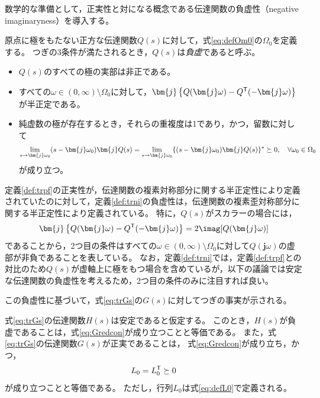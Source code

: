 \documentclass[tombow,dvipdfmx]{corona-a5}
\begin{document}
数学的な準備として，正実性と対になる概念である伝達関数の負虚性（negative imaginaryness）を導入する\cite{petersen2010feedback,xiong2010negative}。

\begin{定義}[伝達関数の負虚性]
\label{def:trni}
原点に極をもたない正方な伝達関数$Q(s)$に対して，式\ref{eq:defOm0}の$\Omega_0$を定義する。
つぎの3条件が満たされるとき，$Q(s)$は\emph{負虚}であると呼ぶ。
\begin{itemize}
\item $Q(s)$のすべての極の実部は非正である。
\item すべての$\omega \in (0,\infty)\setminus \Omega_0$に対して，$\bm{j}\left\{Q(\bm{j} \omega) - Q^{\sf T}(-\bm{j} \omega) \right\}$が半正定である。
\item 純虚数の極が存在するとき，それらの重複度は1であり，かつ，留数に対して
\begin{align*}
\lim_{s \rightarrow \bm{j} \omega_0} (s-\bm{j} \omega_0) \bm{j} Q(s) = 
\lim_{s\rightarrow \bm{j} \omega_0} \{ (s-\bm{j} \omega_0) \bm{j} Q(s)\}^{\sf *}\succeq 0
,\quad
\forall \omega_0 \in \Omega_0
\end{align*}
が成り立つ。
\end{itemize}
\end{定義}

定義\ref{def:trpf}の正実性が，伝達関数の複素対称部分に関する半正定性により定義されていたのに対して，定義\ref{def:trni}の負虚性は，伝達関数の複素歪対称部分に関する半正定性により定義されている。
特に，$Q(s)$がスカラーの場合には，
\begin{align*}
\bm{j}\left\{Q(\bm{j} \omega) - Q^{\sf T}(-\bm{j} \omega) \right\}
= 2 \imag[Q(\bm{j} \omega)]
\end{align*}
であることから，2つ目の条件はすべての$\omega \in (0,\infty)\setminus \Omega_0$に対して$Q(\bm{j}\omega)$の虚部が非負であることを表している。
なお，定義\ref{def:trni}では，定義\ref{def:trpf}との対比のため$Q(s)$が虚軸上に極をもつ場合を含めているが，以下の議論では安定な伝達関数の負虚性を考えるため，2つ目の条件のみに注目すれば良い。

この負虚性に基づいて，式\ref{eq:trGs}の$G(s)$に対してつぎの事実が示される。

\begin{定理}[電気的サブシステムの伝達関数の正実性]
\label{thm:EdynNI}
式\ref{eq:trGs}の伝達関数$H(s)$は安定であると仮定する。
このとき，$H(s)$が負虚であることは，式\ref{eq:Gredcon}が成り立つことと等価である。
また，式\ref{eq:trGs}の伝達関数$G(s)$が正実であることは，
式\ref{eq:Gredcon}が成り立ち，かつ，
\begin{align}\label{eq:pdsp}
L_0 =L_0^{\sf T} \succeq 0
\end{align}
が成り立つことと等価である。
ただし，行列$L_0$は式\ref{eq:defL0}で定義される。
\end{定理}
\end{document}
